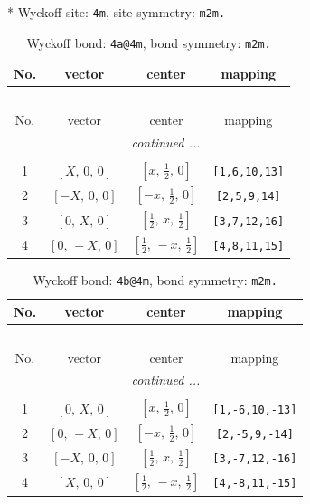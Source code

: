 \documentclass[fleqn,8pt]{jsarticle}
\begin{document}
* Wyckoff site: {\tt 4m}, site symmetry: {\tt m2m.}
\renewcommand{\arraystretch}{1.2}
\begin{longtable}{cccc}
\caption{Wyckoff bond: {\tt 4a@4m}, bond symmetry: {\tt m2m.}}
 \\
 \hline \hline
No. & vector & center & mapping \\ \hline \endfirsthead

\multicolumn{3}{l}{\tablename\ \thetable{}} \\
 \hline \hline
No. & vector & center & mapping \\ \hline \endhead

 \hline \hline
\multicolumn{3}{r}{\footnotesize\it continued ...} \\ \endfoot

 \hline \hline
\multicolumn{3}{r}{} \\ \endlastfoot

1 & $\left[ X,\, 0,\, 0 \right]$ & $\left[ x,\, \frac{1}{2},\, 0 \right]$ & {\tt [1,6,10,13]} \\ \hline
2 & $\left[ - X,\, 0,\, 0 \right]$ & $\left[ - x,\, \frac{1}{2},\, 0 \right]$ & {\tt [2,5,9,14]} \\ \hline
3 & $\left[ 0,\, X,\, 0 \right]$ & $\left[ \frac{1}{2},\, x,\, \frac{1}{2} \right]$ & {\tt [3,7,12,16]} \\ \hline
4 & $\left[ 0,\, - X,\, 0 \right]$ & $\left[ \frac{1}{2},\, - x,\, \frac{1}{2} \right]$ & {\tt [4,8,11,15]} \\
\end{longtable}
\renewcommand{\arraystretch}{1.2}
\begin{longtable}{cccc}
\caption{Wyckoff bond: {\tt 4b@4m}, bond symmetry: {\tt m2m.}}
 \\
 \hline \hline
No. & vector & center & mapping \\ \hline \endfirsthead

\multicolumn{3}{l}{\tablename\ \thetable{}} \\
 \hline \hline
No. & vector & center & mapping \\ \hline \endhead

 \hline \hline
\multicolumn{3}{r}{\footnotesize\it continued ...} \\ \endfoot

 \hline \hline
\multicolumn{3}{r}{} \\ \endlastfoot

1 & $\left[ 0,\, X,\, 0 \right]$ & $\left[ x,\, \frac{1}{2},\, 0 \right]$ & {\tt [1,-6,10,-13]} \\ \hline
2 & $\left[ 0,\, - X,\, 0 \right]$ & $\left[ - x,\, \frac{1}{2},\, 0 \right]$ & {\tt [2,-5,9,-14]} \\ \hline
3 & $\left[ - X,\, 0,\, 0 \right]$ & $\left[ \frac{1}{2},\, x,\, \frac{1}{2} \right]$ & {\tt [3,-7,12,-16]} \\ \hline
4 & $\left[ X,\, 0,\, 0 \right]$ & $\left[ \frac{1}{2},\, - x,\, \frac{1}{2} \right]$ & {\tt [4,-8,11,-15]} \\
\end{longtable}
\end{document}
